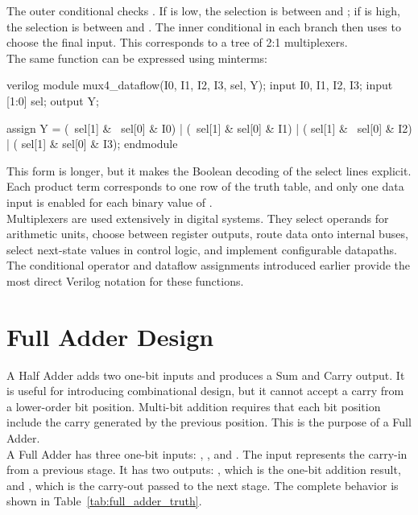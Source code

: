 \noindent The outer conditional checks . If  is low, the
selection is between  and ; if  is high, the
selection is between  and . The inner conditional in each branch then
uses  to choose the final input. This corresponds to a tree of 2:1 multiplexers.\\

\noindent The same function can be expressed using minterms:

\begin{codeblock}{verilog}
module mux4_dataflow(I0, I1, I2, I3, sel, Y);
    input I0, I1, I2, I3;
    input [1:0] sel;
    output Y;

    assign Y = (~sel[1] & ~sel[0] & I0) |
               (~sel[1] &  sel[0] & I1) |
               ( sel[1] & ~sel[0] & I2) |
               ( sel[1] &  sel[0] & I3);
endmodule
\end{codeblock}

\noindent This form is longer, but it makes the Boolean decoding of the select lines explicit. Each
product term corresponds to one row of the truth table, and only one data input is enabled for each
binary value of .\\

\noindent Multiplexers are used extensively in digital systems. They select operands for arithmetic
units, choose between register outputs, route data onto internal buses, select next-state values in
control logic, and implement configurable datapaths. The conditional operator and dataflow
assignments introduced earlier provide the most direct Verilog notation for these functions.

\section{Full Adder Design}
A Half Adder adds two one-bit inputs and produces a Sum and Carry output. It is useful for
introducing combinational design, but it cannot accept a carry from a lower-order bit position.
Multi-bit addition requires that each bit position include the carry generated by the previous
position. This is the purpose of a Full Adder.\\

\noindent A Full Adder has three one-bit inputs: , , and
. The input  represents the carry-in from a previous stage. It has
two outputs: , which is the one-bit addition result, and , which is
the carry-out passed to the next stage. The complete behavior is shown in
Table~\ref{tab:full_adder_truth}.

